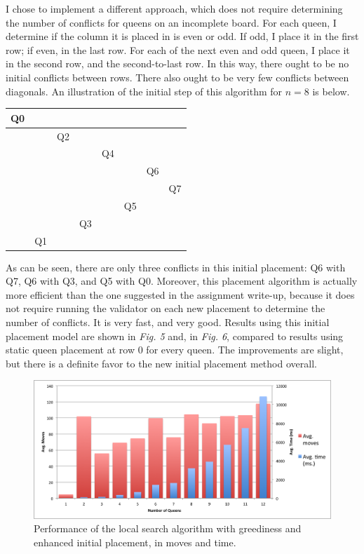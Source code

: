 \documentclass{article}
\begin{document}
\begin{doublespace}
I chose to implement a different approach, which does not require determining the number of conflicts for queens on an incomplete board. For each queen, I determine if the column it is placed in is even or odd. If odd, I place it in the first row; if even, in the last row. For each of the next even and odd queen, I place it in the second row, and the second-to-last row. In this way, there ought to be no initial conflicts between rows. There also ought to be very few conflicts between diagonals. An illustration of the initial step of this algorithm for $n = 8$ is below.\\

\begin{center}
\begin{tabular}{|c|c|c|c|c|c|c|c|}
\hline
Q0&  &  &  &  &  &  &  \\ \hline
  &  &Q2&  &  &  &  &  \\ \hline
  &  &  &  &Q4&  &  &  \\ \hline
  &  &  &  &  &  &Q6&  \\ \hline    
  &  &  &  &  &  &  &Q7\\ \hline
  &  &  &  &  &Q5&  &  \\ \hline
  &  &  &Q3&  &  &  &  \\ \hline
  &Q1&  &  &  &  &  &  \\ \hline        
\end{tabular}
\end{center}

As can be seen, there are only three conflicts in this initial placement: Q6 with Q7, Q6 with Q3, and Q5 with Q0. Moreover, this placement algorithm is actually more efficient than the one suggested in the assignment write-up, because it does not require running the validator on each new placement to determine the number of conflicts. It is very fast, and very good. Results using this initial placement model are shown in \textit{Fig. 5} and, in \textit{Fig. 6}, compared to results using static queen placement at row 0 for every queen. The improvements are slight, but there is a definite favor to the new initial placement method overall.

\begin{figure}[ht!]
\centering
\includegraphics[width=6.5in]{./awesome.png}
\caption{Performance of the local search algorithm with greediness and enhanced initial placement, in moves and time.}
\end{figure}


\end{doublespace}
\end{document}
